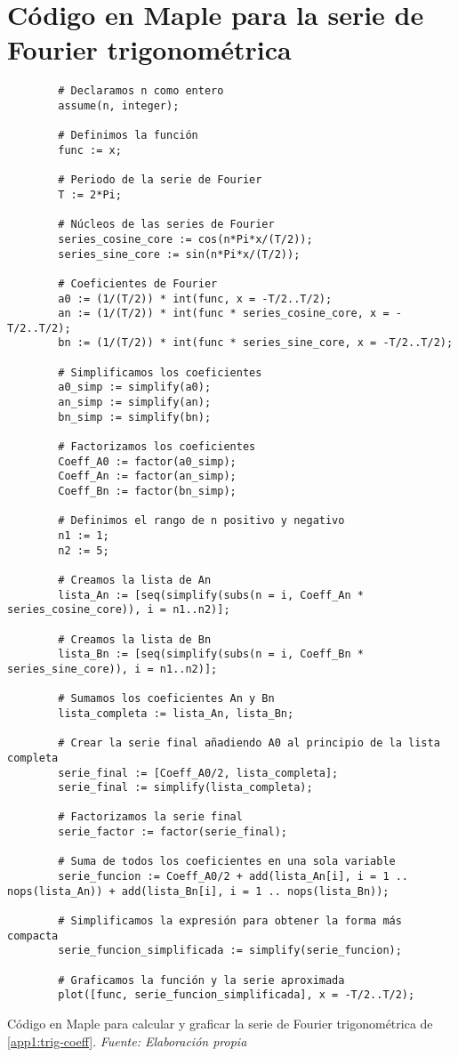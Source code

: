 \section{Código en Maple para la serie de Fourier trigonométrica}\label{app2:trig-code-maple}
\begin{longlisting}
	\begin{verbatim}
		# Declaramos n como entero
		assume(n, integer);
		
		# Definimos la función
		func := x;
	
		# Periodo de la serie de Fourier
		T := 2*Pi;
		
		# Núcleos de las series de Fourier
		series_cosine_core := cos(n*Pi*x/(T/2));
		series_sine_core := sin(n*Pi*x/(T/2));
		
		# Coeficientes de Fourier
		a0 := (1/(T/2)) * int(func, x = -T/2..T/2);
		an := (1/(T/2)) * int(func * series_cosine_core, x = -T/2..T/2);
		bn := (1/(T/2)) * int(func * series_sine_core, x = -T/2..T/2);
		
		# Simplificamos los coeficientes
		a0_simp := simplify(a0);
		an_simp := simplify(an);
		bn_simp := simplify(bn);
		
		# Factorizamos los coeficientes
		Coeff_A0 := factor(a0_simp);
		Coeff_An := factor(an_simp);
		Coeff_Bn := factor(bn_simp);
		
		# Definimos el rango de n positivo y negativo
		n1 := 1;
		n2 := 5;
		
		# Creamos la lista de An
		lista_An := [seq(simplify(subs(n = i, Coeff_An * series_cosine_core)), i = n1..n2)];
		
		# Creamos la lista de Bn
		lista_Bn := [seq(simplify(subs(n = i, Coeff_Bn * series_sine_core)), i = n1..n2)];
		
		# Sumamos los coeficientes An y Bn
		lista_completa := lista_An, lista_Bn;
		
		# Crear la serie final añadiendo A0 al principio de la lista completa
		serie_final := [Coeff_A0/2, lista_completa];
		serie_final := simplify(lista_completa);
		
		# Factorizamos la serie final
		serie_factor := factor(serie_final);
		
		# Suma de todos los coeficientes en una sola variable
		serie_funcion := Coeff_A0/2 + add(lista_An[i], i = 1 .. nops(lista_An)) + add(lista_Bn[i], i = 1 .. nops(lista_Bn));
		
		# Simplificamos la expresión para obtener la forma más compacta
		serie_funcion_simplificada := simplify(serie_funcion);
		
		# Graficamos la función y la serie aproximada
		plot([func, serie_funcion_simplificada], x = -T/2..T/2);	
	\end{verbatim}
	\caption[Código en Maple para calcular y graficar la serie de Fourier trigonométrica de \ref{app1:trig-coeff}.] {Código en Maple para calcular y graficar la serie de Fourier trigonométrica de \ref{app1:trig-coeff}. \textit{Fuente: Elaboración propia}} 
\end{longlisting}


